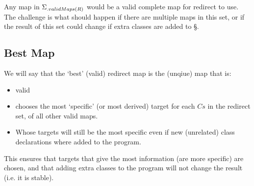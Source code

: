 \begin{defs}
\end{defs}
Any map in $\Sigma{\ensuremath{{}_{.{validMaps}({R})}}}$ would be a valid complete map for redirect to use. The challenge is what should happen if there are multiple maps in this set, or if the result of this set could change if extra classes are added to \S.

\subsection {Best Map}
We will say that the `best' (valid) redirect map is the (unqiue) map that is:
\begin{itemize}
	\item valid
	\item chooses the most `specific' (or most derived) target for each $Cs$ in the redirect set, of all other valid maps.
	\item Whose targets will still be the most specific even if new (unrelated) class declarations where added to the program. 
\end{itemize}

This ensures that targets that give the most information (are more specific) are chosen, and that adding extra classes to the program will not change the result (i.e. it is stable).


